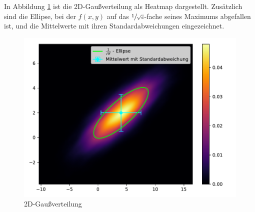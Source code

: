 In Abbildung \ref{fig:ellips} ist die 2D-Gaußverteilung als Heatmap dargestellt.
Zusätzlich sind die Ellipse, bei der $f(x,y)$ auf das $\sfrac{1}{\sqrt{e}}$-fache seines Maximums abgefallen ist, und die Mittelwerte mit ihren Standardabweichungen eingezeichnet.
\begin{figure}[H]
  \centering
  \includegraphics[width=\textwidth]{Aufgabe07/ellipse.pdf}
  \caption{2D-Gaußverteilung}
  \label{fig:ellips}
\end{figure}
